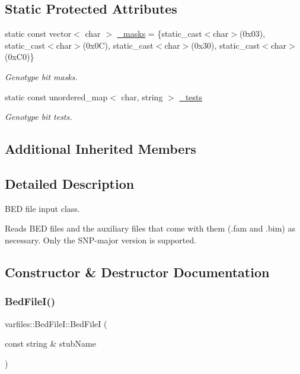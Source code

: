 \subsection*{Static Protected Attributes}
\begin{DoxyCompactItemize}
\item 
static const vector$<$ char $>$ \hyperlink{classvarfiles_1_1_bed_file_i_a6f65201e88cd1cb3f0fb077af2624d44}{\+\_\+masks} = \{static\+\_\+cast$<$char$>$(0x03), static\+\_\+cast$<$char$>$(0x0\+C), static\+\_\+cast$<$char$>$(0x30), static\+\_\+cast$<$char$>$(0x\+C0)\}
\begin{DoxyCompactList}\small\item\em Genotype bit masks. \end{DoxyCompactList}\item 
static const unordered\+\_\+map$<$ char, string $>$ \hyperlink{classvarfiles_1_1_bed_file_i_a1dcd5f68e2cf5acdd5227ef226af81f3}{\+\_\+tests}
\begin{DoxyCompactList}\small\item\em Genotype bit tests. \end{DoxyCompactList}\end{DoxyCompactItemize}
\subsection*{Additional Inherited Members}


\subsection{Detailed Description}
B\+ED file input class. 

Reads B\+ED files and the auxiliary files that come with them (.fam and .bim) as necessary. Only the S\+N\+P-\/major version is supported. 

\subsection{Constructor \& Destructor Documentation}
\mbox{\label{classvarfiles_1_1_bed_file_i_a08cbc6ce12b27682fe9742317be1d434}} 
\subsubsection{\texorpdfstring{Bed\+File\+I()}{BedFileI()}}
{\footnotesize\ttfamily varfiles\+::\+Bed\+File\+I\+::\+Bed\+FileI (\begin{DoxyParamCaption}\item[{const string \&}]{stub\+Name }\end{DoxyParamCaption})\hspace{0.3cm}{\ttfamily [inline]}}



